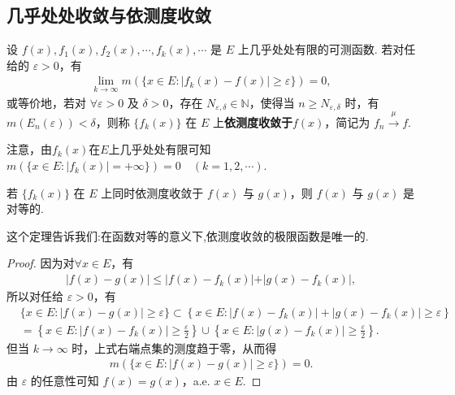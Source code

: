 \documentclass[../../main.tex]{subfiles}
\begin{document}
\subsection{几乎处处收敛与依测度收敛}

\begin{definition}
设 $f(x),f_1(x),f_2(x),\cdots,f_k(x),\cdots$ 是 $E$ 上几乎处处有限的可测函数. 若对任给的 $\varepsilon>0$，有
\begin{align}
\lim_{k\to\infty}m(\{x\in E:\vert f_k(x)-f(x)\vert \geqslant \varepsilon\}) = 0,\label{eq:3.7}
\end{align}
或等价地，若对 $\forall\varepsilon > 0$ 及 $\delta > 0$，存在 $N_{\varepsilon,\delta}\in\mathbb{N}$，使得当 $n\geqslant N_{\varepsilon,\delta}$ 时，有 $m(E_n(\varepsilon)) < \delta$，则称 $\{f_k(x)\}$ 在 $E$ 上\textbf{依测度收敛于}$f(x)$，简记为 $f_n\stackrel{\mu}{\longrightarrow}f$. 
\end{definition}
\begin{remark}
注意，由$f_k(x)$在$E$上几乎处处有限可知$m(\{x\in E:\vert f_k(x)\vert=+\infty\}) = 0\quad (k = 1,2,\cdots)$. 
\end{remark}

\begin{theorem}\label{theorem:依测度收敛的极限函数必唯一}
若 $\{f_k(x)\}$ 在 $E$ 上同时依测度收敛于 $f(x)$ 与 $g(x)$，则 $f(x)$ 与 $g(x)$ 是对等的.
\end{theorem}
\begin{note}
这个定理告诉我们:在函数对等的意义下,依测度收敛的极限函数是唯一的.
\end{note}
\begin{proof}
因为对$\forall x\in E$，有
\begin{align*}
\vert f(x)-g(x)\vert\leqslant\vert f(x)-f_k(x)\vert+\vert g(x)-f_k(x)\vert,
\end{align*}
所以对任给 $\varepsilon>0$，有
\begin{align*}
&\{x\in E:\left| f(x)-g(x) \right|\geqslant \varepsilon \}\subset \left\{ x\in E:\left| f\left( x \right) -f_k\left( x \right) \right|+\left| g\left( x \right) -f_k\left( x \right) \right|\geqslant \varepsilon \right\} 
\\
&=\left\{ x\in E:\left| f(x)-f_k(x) \right|\geqslant \frac{\varepsilon}{2} \right\} \cup \left\{ x\in E:\left| g(x)-f_k(x) \right|\geqslant \frac{\varepsilon}{2} \right\} .
\end{align*}
但当 $k\to\infty$ 时，上式右端点集的测度趋于零，从而得
\begin{align*}
m(\{x\in E:\vert f(x)-g(x)\vert\geqslant \varepsilon\}) = 0.
\end{align*}
由 $\varepsilon$ 的任意性可知 $f(x)=g(x)$，a.e. $x\in E$. 

\end{proof}
\end{document}
